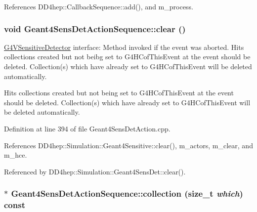 References DD4hep::CallbackSequence::add(), and m\_\-process.\hypertarget{class_d_d4hep_1_1_simulation_1_1_geant4_sens_det_action_sequence_ab2bab9282950af33d3e14e3f0d5864fd}{
\subsubsection[{clear}]{\setlength{\rightskip}{0pt plus 5cm}void Geant4SensDetActionSequence::clear ()}}
\label{class_d_d4hep_1_1_simulation_1_1_geant4_sens_det_action_sequence_ab2bab9282950af33d3e14e3f0d5864fd}


\hyperlink{class_g4_v_sensitive_detector}{G4VSensitiveDetector} interface: Method invoked if the event was aborted. Hits collections created but not beibg set to G4HCofThisEvent at the event should be deleted. Collection(s) which have already set to G4HCofThisEvent will be deleted automatically.

Hits collections created but not being set to G4HCofThisEvent at the event should be deleted. Collection(s) which have already set to G4HCofThisEvent will be deleted automatically. 

Definition at line 394 of file Geant4SensDetAction.cpp.

References DD4hep::Simulation::Geant4Sensitive::clear(), m\_\-actors, m\_\-clear, and m\_\-hce.

Referenced by DD4hep::Simulation::Geant4SensDet::clear().\hypertarget{class_d_d4hep_1_1_simulation_1_1_geant4_sens_det_action_sequence_af50bd4353281e47a0fdf09bee888b092}{
\subsubsection[{collection}]{ $\ast$ Geant4SensDetActionSequence::collection (size\_\-t {\em which}) const}}
\label{class_d_d4hep_1_1_simulation_1_1_geant4_sens_det_action_sequence_af50bd4353281e47a0fdf09bee888b092}


